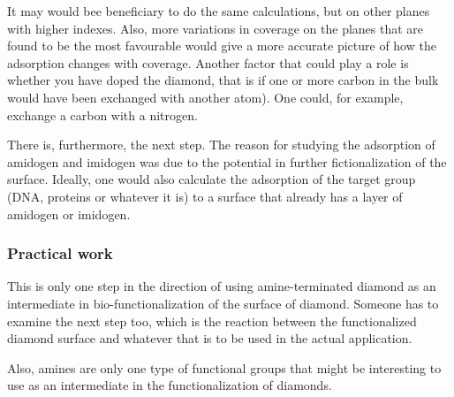 \documentclass[12pt,a4paper]{article}
\begin{document}
It may would bee beneficiary to do the same calculations, but on other planes with higher indexes. Also, more variations in coverage on the planes that are found to be the most favourable would give a more accurate picture of how the adsorption changes with coverage. Another factor that could play a role is whether you have doped the diamond, that is if one or more carbon in the bulk would have been exchanged with another atom). One could, for example, exchange a carbon with a nitrogen.

There is, furthermore, the next step. The reason for studying the adsorption of amidogen and imidogen was due to the potential in further fictionalization of the surface. Ideally, one would also calculate the adsorption of the target group (DNA, proteins or whatever it is) to a surface that already has a layer of amidogen or imidogen.

\subsubsection{Practical work}
This is only one step in the direction of using amine-terminated diamond as an intermediate in bio-functionalization of the surface of diamond. Someone has to examine the next step too, which is the reaction between the functionalized diamond surface and whatever that is to be used in the actual application. 

Also, amines are only one type of functional groups that might be interesting to use as an intermediate in the functionalization of diamonds. 


\printbibliography
\end{document}
